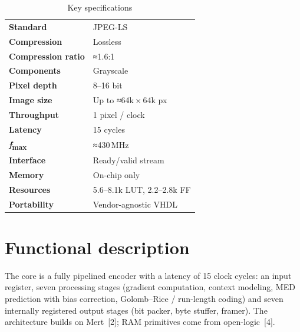 \documentclass[10pt,a4paper]{article}
\newcommand{\fmax}{\textit{f}\textsubscript{max}}
\newcommand{\about}{≈}
\begin{document}
\begin{table}[H]
  \centering
  \caption{Key specifications}
  \label{tab:overview}
\begin{tabularx}{\textwidth}{@{}>{\bfseries}l X@{}}
  \toprule
  Standard      & JPEG-LS\footnotemark[1] \\
  Compression   & Lossless \\
  Compression ratio & \about1.6:1\footnotemark[2] \\
  Components    & Grayscale \\
  Pixel depth   & 8--16 bit\footnotemark[3] \\
  Image size    & Up to \about64k\,×\,64k px\footnotemark[4] \\
  Throughput    & 1 pixel / clock \\
  Latency       & 15 cycles \\
  \fmax{}       & \about430\,MHz\footnotemark[5] \\
  Interface     & Ready/valid stream\footnotemark[6] \\
  Memory        & On-chip only\footnotemark[7] \\
  Resources     & 5.6--8.1k LUT, 2.2--2.8k FF\footnotemark[8] \\
  Portability   & Vendor-agnostic VHDL \\
  \bottomrule
\end{tabularx}
\end{table}
\setcounter{footnote}{8}

\section{Functional description}
The core is a fully pipelined encoder with a latency of 15 clock cycles: an
input register, seven processing stages (gradient computation, context modeling,
MED prediction with bias correction, Golomb--Rice / run-length coding) and
seven internally registered output stages (bit packer, byte stuffer, framer).
The architecture builds on Mert~[2]; RAM primitives come from open-logic~[4].
\end{document}
